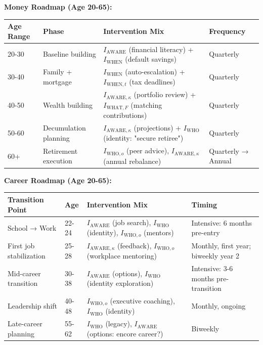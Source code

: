 {{{\textbf{Money Roadmap (Age 20-65):}

\begin{center}
\begin{tabular}{@{}llll@{}}
\toprule
\textbf{Age Range} & \textbf{Phase} & \textbf{Intervention Mix} & \textbf{Frequency} \\
\midrule
20-30 & Baseline building & $I_{\text{AWARE}}$ (financial literacy) + $I_{\text{WHEN}}$ (default savings) & Quarterly \\
30-40 & Family + mortgage & $I_{\text{WHEN}}$ (auto-escalation) + $I_{\text{WHEN},t}$ (tax deadlines) & Quarterly \\
40-50 & Wealth building & $I_{\text{AWARE},\kappa}$ (portfolio review) + $I_{\text{WHAT},F}$ (matching contributions) & Quarterly \\
50-60 & Decumulation planning & $I_{\text{AWARE},\kappa}$ (projections) + $I_{\text{WHO}}$ (identity: "secure retiree") & Quarterly \\
60+ & Retirement execution & $I_{\text{WHO},o}$ (peer advice), $I_{\text{AWARE},\kappa}$ (annual rebalance) & Quarterly → Annual \\
\midrule
\end{tabular}
\end{center}

\textbf{Career Roadmap (Age 20-65):}

\begin{center}
\begin{tabular}{@{}llll@{}}
\toprule
\textbf{Transition Point} & \textbf{Age} & \textbf{Intervention Mix} & \textbf{Timing} \\
\midrule
School → Work & 22-24 & $I_{\text{AWARE}}$ (job search), $I_{\text{WHO}}$ (identity), $I_{\text{WHO},o}$ (mentors) & Intensive: 6 months pre-entry \\
First job stabilization & 25-28 & $I_{\text{AWARE},\kappa}$ (feedback), $I_{\text{WHO},o}$ (workplace mentoring) & Monthly, first year; biweekly year 2 \\
Mid-career transition & 30-38 & $I_{\text{AWARE}}$ (options), $I_{\text{WHO}}$ (identity exploration) & Intensive: 3-6 months pre-transition \\
Leadership shift & 40-48 & $I_{\text{WHO},o}$ (executive coaching), $I_{\text{WHO}}$ (identity) & Monthly, ongoing \\
Late-career planning & 55-62 & $I_{\text{WHO}}$ (legacy), $I_{\text{AWARE}}$ (options: encore career?) & Biweekly \\
\midrule
\end{tabular}
\end{center}

}}}
